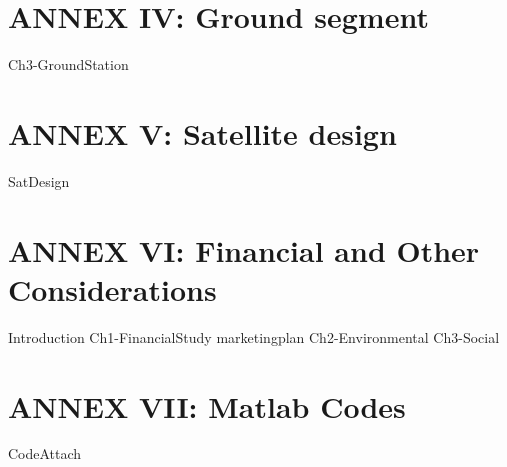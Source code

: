 \part{ANNEX IV: Ground segment}
{Ch3-GroundStation}

\part{ANNEX V: Satellite design}
{SatDesign}

\part{ANNEX VI: Financial and Other Considerations}
{Introduction}
{Ch1-FinancialStudy}
{marketingplan}
{Ch2-Environmental}
{Ch3-Social}

\part{ANNEX VII: Matlab Codes}
{CodeAttach}




%
% 

